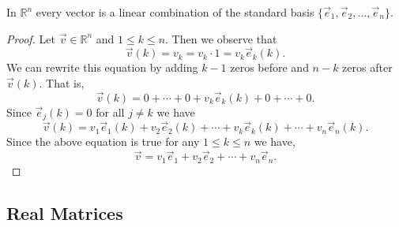 \begin{proposition}
In $\mathbb{R}^n$ every vector is a linear combination of the standard basis 
$\{\vec{e}_1, \vec{e}_2, \ldots, \vec{e}_n\}$.
\end{proposition}

\begin{proof}
Let $\vec{v} \in \mathbb{R}^n$ and $1\leq k\leq n$. Then we observe that  
\[\vec{v}(k)=v_k=v_k\cdot 1=v_k \vec{e}_k(k).\]
We can rewrite this equation by adding $k-1$ zeros before and $n-k$ zeros 
after $\vec{v}(k)$. That is,  
\[\vec{v}(k)=0+ \cdots + 0+v_k\vec{e}_k(k)+0+\cdots+0.\] 
Since $\vec{e}_j(k)=0$ for all $j\neq k$ we have 
\[\vec{v}(k)=v_1\vec{e}_1(k)+v_2\vec{e}_2(k)+\cdots+ v_k\vec{e}_k(k)+ \cdots + 
v_n\vec{e}_n(k).\]
Since the above equation is true for any $1\leq k\leq n$ we have,  
\[\vec{v}=v_1\vec{e}_1+v_2\vec{e}_2+\cdots+ v_n\vec{e}_n.\]
\end{proof}


\subsection{Real Matrices}

